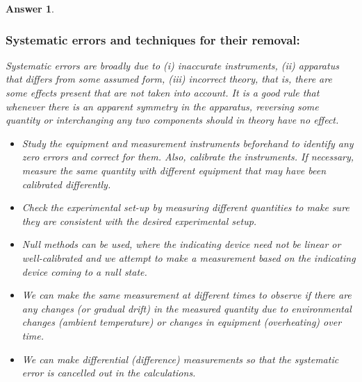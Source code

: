 \documentclass[a4paper]{article}
\newtheorem{ans}{Answer}[subsection]
\theoremstyle{new}
\begin{document}
\begin{ans}
\subsubsection*{Systematic errors and techniques for their removal:}
Systematic errors are broadly due to (i) inaccurate instruments, (ii) apparatus that differs from some assumed form, (iii) incorrect theory, that is, there are some effects present that are not taken into account. It is a good rule that whenever there is an apparent symmetry in the apparatus, reversing some quantity or interchanging any two components should in theory have no effect.
\begin{itemize}
    \item Study the equipment and measurement instruments beforehand to identify any zero errors and correct for them. Also, calibrate the instruments. If necessary, measure the same quantity with different equipment that may have been calibrated differently.
    \item Check the experimental set-up by measuring different quantities to make sure they are consistent with the desired experimental setup.
    \item Null methods can be used, where the indicating device need not be linear or well-calibrated and we attempt to make a measurement based on the indicating device coming to a null state.
    \item We can make the same measurement at different times to observe if there are any changes (or gradual drift) in the measured quantity due to environmental changes (ambient temperature) or changes in equipment (overheating) over time.
    \item We can make differential (difference) measurements so that the systematic error is cancelled out in the calculations.
\end{itemize}
\newpage

\end{ans}
\end{document}
